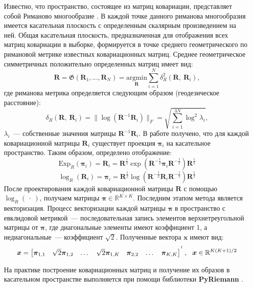 \documentclass[a4paper, 12pt]{extarticle}
\begin{document}
Известно, что пространство, состоящее из матриц ковариации, представляет собой 
Риманово многообразие \citep{barachant2010riemannian}. 
В каждой точке данного риманова многообразия имеется касательная плоскость с 
определенным скалярным произведением на ней. Общая касательная плоскость, 
предназначенная для отображения всех матриц ковариации в выборке, 
формируется в точке среднего геометрического по римановой метрике 
известных ковариационных матриц. Среднее геометрическое симметричных положительно определенных матриц \citep{moakher2005differential} имеет вид:
$$\bm{R} = \mathfrak{G}\left(\bm{R}_1,\dots,\bm{R}_N\right) = \underset{\bm{R}}{\text{argmin}}\sum_{i = 1}^N
\delta^2_R(\bm{R},~\bm{R}_i),$$
где риманова метрика определяется следующим образом (геодезическое расстояние):
$$\delta_R(\bm{R},~\bm{R}_i) = \|\log (\bm{R}^{-1}\bm{R}_i)\|_F = \sqrt{\sum_{i = 1}^{3N} \log^2\lambda_i},$$
$\lambda_i$~--- собственные значения матрицы $\bm{R}^{-1}\bm{R}_i$. В работе \citep{barachant2010riemannian}
получено, что для каждой ковариационной матрицы $\bm{R}_i$ существует проекция $\bm{\pi}_i$ на касательное пространство.
Таким образом, определено отображение:
$$\text{Exp}_{R}(\bm{\pi}_i) = \bm{R}_i = \bm{R}^{\frac{1}{2}} \exp\left(\bm{R}^{-\frac{1}{2}}\bm{\pi}_i\bm{R}^{-\frac{1}{2}}\right) \bm{R}^{\frac{1}{2}}$$
$$\log_{R}(\bm{R}_i) = \bm{\pi}_i = \bm{R}^{\frac{1}{2}} \log\left(\bm{R}^{-\frac{1}{2}}\bm{R}_i\bm{R}^{-\frac{1}{2}}\right) \bm{R}^{\frac{1}{2}}$$
После проектирования каждой ковариационной матрицы $\bm{R}$ с помощью $\log_{R}(~\cdot~)$, получаем
матрицы $\bm{\pi} \in \mathbb{R}^{K\times K}$. 
Последним этапом метода является векторизация.
Процесс векторизации каждой матрицы $\bm{\pi}$ в пространство с евклидовой метрикой~---
последовательная запись элементов верхнетреугольной матрицы от $\bm{\pi}$, 
где диагональные элементы имеют коэффициент 1, а недиагональные~--- коэффициент $\sqrt{2}$. 
Полученные вектора $\bm{x}$ имеют вид:
\begin{equation*}
	\bm{x} = \begin{bmatrix}
		\bm{\pi}_{1,1} & \sqrt{2} \bm{\pi}_{1,2} &  \dots  &  \sqrt{2}\bm{\pi}_{1,K} & \bm{\pi}_{2,2} & \dots & \bm{\pi}_{K,K}
		\end{bmatrix}^{^{\mathsf{T}}},~~\bm{x} \in \mathbb{R}^{K(K+1)/2}
\end{equation*}

На практике построение ковариационных матриц и получение их образов в касательном пространстве выполняется 
при помощи библиотеки \textbf{PyRiemann} \citep{barachant2018pyriemann}.
\end{document}
